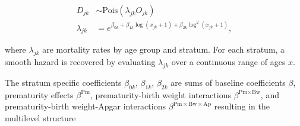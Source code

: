 \documentclass[10pt,twoside,reqno]{article}
\begin{document}
\begin{equation}
  \begin{aligned}
    D_{jk} &\sim \text{Pois}\left(\lambda_{jk}O_{jk}\right) \\
    \lambda_{jk} &= e^{\beta_{0k} +
    \beta_{1k}\log(x_{jk}+1) +
    \beta_{2k}\log^2(x_{jk}+1)},
  \end{aligned}
\label{eq:themodel}
\end{equation}

where \(\lambda_{jk}\) are mortality rates by age group and stratum. For each stratum, a smooth hazard is recovered by evaluating \(\lambda_{jk}\) over a continuous range of ages \(x\).

The stratum specific coefficients \(\beta_{0k}\), \(\beta_{1k}\), \(\beta_{2k}\) are sums of baseline coefficients \(\beta\), prematurity effects \(\beta^\text{Pm}\), prematurity-birth weight interactions \(\beta^{\text{Pm}\times\text{Bw}}\), and prematurity-birth weight-Apgar interactions \(\beta^{\text{Pm}\times\text{Bw}\times\text{Ap}}\) resulting in the multilevel structure
\end{document}
